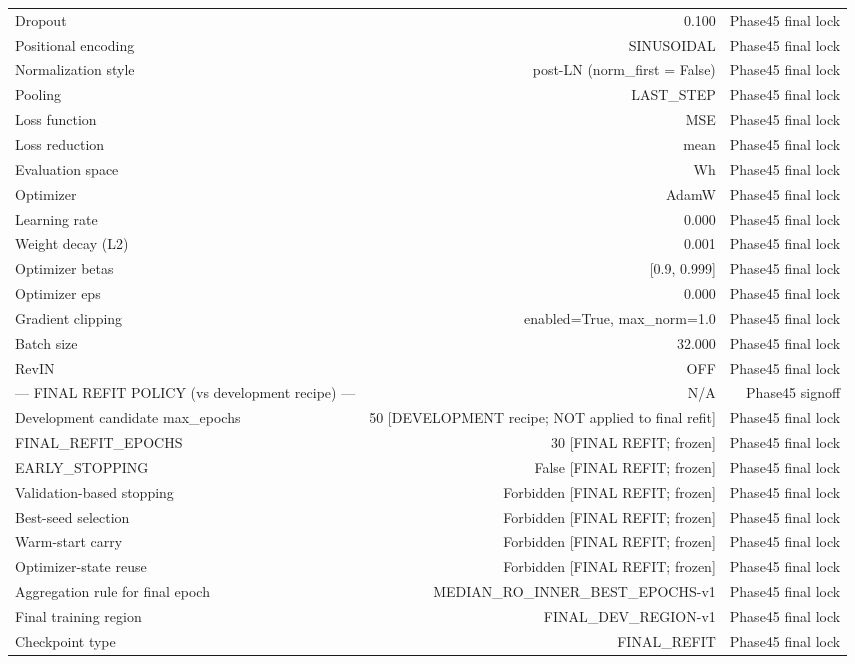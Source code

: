 \begin{table}[h!]
\begin{tabular}{lrr}
Dropout & 0.100 & Phase45 final lock \\
Positional encoding & SINUSOIDAL & Phase45 final lock \\
Normalization style & post-LN (norm\_first = False) & Phase45 final lock \\
Pooling & LAST\_STEP & Phase45 final lock \\
Loss function & MSE & Phase45 final lock \\
Loss reduction & mean & Phase45 final lock \\
Evaluation space & Wh & Phase45 final lock \\
Optimizer & AdamW & Phase45 final lock \\
Learning rate & 0.000 & Phase45 final lock \\
Weight decay (L2) & 0.001 & Phase45 final lock \\
Optimizer betas & [0.9, 0.999] & Phase45 final lock \\
Optimizer eps & 0.000 & Phase45 final lock \\
Gradient clipping & enabled=True, max\_norm=1.0 & Phase45 final lock \\
Batch size & 32.000 & Phase45 final lock \\
RevIN & OFF & Phase45 final lock \\
--- FINAL REFIT POLICY (vs development recipe) --- & N/A & Phase45 signoff \\
Development candidate max\_epochs & 50 [DEVELOPMENT recipe; NOT applied to final refit] & Phase45 final lock \\
FINAL\_REFIT\_EPOCHS & 30 [FINAL REFIT; frozen] & Phase45 final lock \\
EARLY\_STOPPING & False [FINAL REFIT; frozen] & Phase45 final lock \\
Validation-based stopping & Forbidden [FINAL REFIT; frozen] & Phase45 final lock \\
Best-seed selection & Forbidden [FINAL REFIT; frozen] & Phase45 final lock \\
Warm-start carry & Forbidden [FINAL REFIT; frozen] & Phase45 final lock \\
Optimizer-state reuse & Forbidden [FINAL REFIT; frozen] & Phase45 final lock \\
Aggregation rule for final epoch & MEDIAN\_RO\_INNER\_BEST\_EPOCHS-v1 & Phase45 final lock \\
Final training region & FINAL\_DEV\_REGION-v1 & Phase45 final lock \\
Checkpoint type & FINAL\_REFIT & Phase45 final lock \\

\end{tabular}
\end{table}

